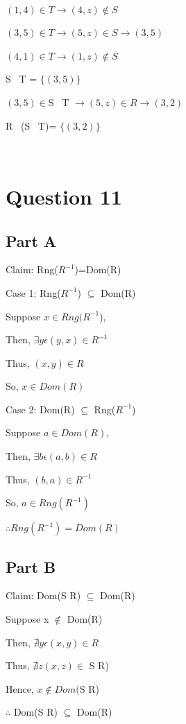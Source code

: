 \documentclass{article}
\begin{document}
\

$(1,4) \in T \rightarrow (4,z) \notin S$

$(3,5) \in T \rightarrow (5,z) \in S \rightarrow (3,5) $

$(4,1) \in T \rightarrow (1,z) \notin S $

S \textopenbullet \  T = $\{(3,5)\}$

$(3,5) \in $S \textopenbullet \  T $ \rightarrow (5,z) \in R \rightarrow (3,2) $

R \textopenbullet \  (S \textopenbullet \  T)= $\{(3,2)\}$

\


\section*{Question 11}
\subsection*{Part A}

Claim: Rng($R^{-1}$)=Dom(R)

Case 1: Rng($R^{-1}$) $\subseteq$ Dom(R)

Suppose $x \in Rng(R^{-1}$),

Then, $\exists y \epsilon (y,x) \in R^{-1}$

Thus, $(x,y) \in R$

So, $x \in Dom(R)$

Case 2: Dom(R) $\subseteq$ Rng($R^{-1}$)

Suppose $a \in Dom(R)$,

Then, $\exists b \epsilon (a,b) \in R$

Thus, $(b,a) \in R^{-1}$

So, $a \in Rng(R^{-1})$

$\therefore Rng(R^{-1})=Dom(R)$

\subsection*{Part B}

Claim: Dom(S \textopenbullet R) $\subseteq$ Dom(R)

Suppose x $\notin$ Dom(R)

Then, $\nexists y \epsilon (x,y) \in R$

Thus, $\nexists z (x,z) \in $ S \textopenbullet R)

Hence, $ x \notin Dom($S \textopenbullet R)

$\therefore$ Dom(S \textopenbullet R) $\subseteq$ Dom(R)
\end{document}
